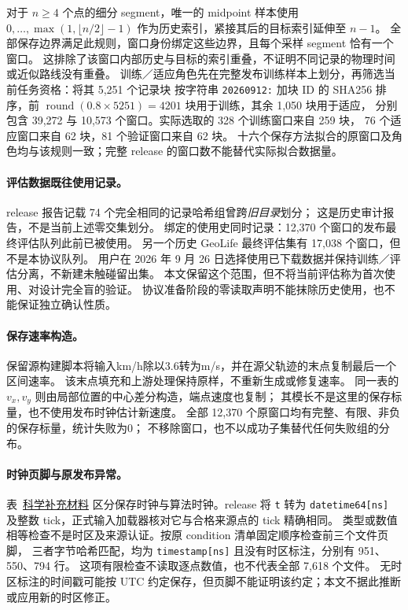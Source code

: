 对于 \(n\geq4\) 个点的细分 segment，唯一的 midpoint 样本使用
\(0,\ldots,\max(1,\lfloor n/2\rfloor-1)\) 作为历史索引，紧接其后的目标索引延伸至 \(n-1\)。
全部保存边界满足此规则，窗口身份绑定这些边界，且每个采样 segment 恰有一个窗口。
这排除了该窗口内部历史与目标的索引重叠，不证明不同记录的物理时间或近似路线没有重叠。
训练／适应角色先在完整发布训练样本上划分，再筛选当前任务资格：将其 5,251 个记录块
按字符串 \texttt{20260912:} 加块 ID 的 SHA256 排序，前
\(\operatorname{round}(0.8\times5251)=4201\) 块用于训练，其余 1,050 块用于适应，
分别包含 39,272 与 10,573 个窗口。实际选取的 328 个训练窗口来自 259 块，
76 个适应窗口来自 62 块，81 个验证窗口来自 62 块。
十六个保存方法拟合的原窗口及角色均与该规则一致；完整 release 的窗口数不能替代实际拟合数据量。

\paragraph{评估数据既往使用记录。}
release 报告记载 74 个完全相同的记录哈希组曾跨\emph{旧目录}划分；
这是历史审计报告，不是当前上述零交集划分。
绑定的使用史同时记录：12,370 个窗口的发布最终评估队列此前已被使用。
另一个历史 GeoLife 最终评估集有 17,038 个窗口，但不是本协议队列。
用户在 2026 年 9 月 26 日选择使用已下载数据并保持训练／评估分离，不新建未触碰留出集。
本文保留这个范围，但不将当前评估称为首次使用、对设计完全盲的验证。
协议准备阶段的零读取声明不能抹除历史使用，也不能保证独立确认性质。

\paragraph{保存速率构造。}
保留源构建脚本将输入km/h除以3.6转为m/s，并在源父轨迹的末点复制最后一个区间速率。
该末点填充和上游处理保持原样，不重新生成或修复速率。
同一表的 $v_x,v_y$ 则由局部位置的中心差分构造，端点速度也复制；
其模长不是这里的保存标量，也不使用发布时钟估计新速度。
全部 12,370 个原窗口均有完整、有限、非负的保存标量，统计失败为0；
不移除窗口，也不以成功子集替代任何失败组的分布。

\paragraph{时钟页脚与原发布异常。}
表~\href{supplement.pdf\#tab:clock-use}{科学补充材料} 区分保存时钟与算法时钟。release 将 \texttt{t} 转为
\texttt{datetime64[ns]} 及整数 tick，正式输入加载器核对它与合格来源点的 tick 精确相同。
类型或数值相等检查不是时区及来源认证。按原 condition 清单固定顺序检查前三个文件页脚，
三者字节哈希匹配，均为 \texttt{timestamp[ns]} 且没有时区标注，分别有 951、550、794 行。
这项有限检查不读取逐点数值，也不代表全部 7,618 个文件。
无时区标注的时间戳可能按 UTC 约定保存，但页脚不能证明该约定；本文不据此推断或应用新的时区修正。

